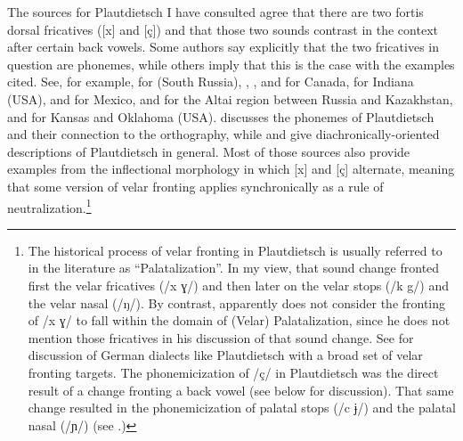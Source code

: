 The sources for Plautdietsch I have consulted agree that there are two fortis dorsal fricatives ([x] and [ç]) and that those two sounds contrast in the context after certain back vowels. Some authors say explicitly that the two fricatives in question are phonemes, while others imply that this is the case with the examples cited. See, for example, \citet{Quiring1928} for  (South Russia), \citet{Goerzen1952}, \citet{Lehn1957}, and \citet{CoxTucker2013} for Canada, \citet{Mierau1964} for Indiana (USA), \citet{Moelleken1966} and \citet{Brandt1992} for Mexico, \citet{Jedig1966} and \citet{Nieuweboer1999} for the Altai region between Russia and Kazakhstan, and \citet{teVeldeVosburg2021} for Kansas and Oklahoma (USA). \citet{Loewen1988} discusses the phonemes of Plautdietsch and their connection to the orthography, while \citet{Naiditch2005} and \citet{Siemens2012} give diachronically-oriented descriptions of Plautdietsch in general. Most of those sources also provide examples from the inflectional morphology in which [x] and [ç] alternate, meaning that some version of velar fronting applies synchronically as a rule of neutralization.\footnote{The historical process of velar fronting in Plautdietsch is usually referred to in the literature as “Palatalization”. In my view, that sound change fronted first the velar fricatives (/x ɣ/) and then later on the velar stops (/k g/) and the velar nasal (/ŋ/). By contrast, \citet[92--98]{Siemens2012} apparently does not consider the fronting of /x ɣ/ to fall within the domain of (Velar) Palatalization, since he does not mention those fricatives in his discussion of that sound change. See  for discussion of German dialects like Plautdietsch with a broad set of velar fronting targets. The phonemicization of /ç/ in Plautdietsch was the direct result of a change fronting a back vowel (see below for discussion). That same change resulted in the phonemicization of palatal stops (/c ɉ/) and the palatal nasal (/ɲ/) (see .)}

